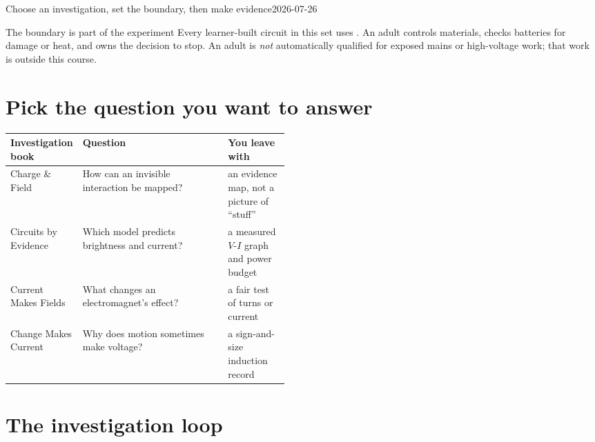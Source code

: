 

  {Choose an investigation, set the boundary, then make evidence}{2026-07-26}

\telosmasthead[\editiontag]

\begin{teloshazard}{The boundary is part of the experiment}
Every learner-built circuit in this set uses \lowvoltage. \stopline
An adult controls materials, checks batteries for damage or heat, and owns the
decision to stop. An adult is \emph{not} automatically qualified for exposed
mains or high-voltage work; that work is outside this course.
\end{teloshazard}

\section{Pick the question you want to answer}
\begin{tabularx}{\linewidth}{@{}p{0.25\linewidth}L p{0.22\linewidth}@{}}
\toprule
\textbf{Investigation book} & \textbf{Question} & \textbf{You leave with}\\
\midrule
Charge \& Field & How can an invisible interaction be mapped? &
an evidence map, not a picture of “stuff”\\
Circuits by Evidence & Which model predicts brightness and current? &
a measured \(V\)-\(I\) graph and power budget\\
Current Makes Fields & What changes an electromagnet's effect? &
a fair test of turns or current\\
Change Makes Current & Why does motion sometimes make voltage? &
a sign-and-size induction record\\
\bottomrule
\end{tabularx}

\section{The investigation loop}
\begin{center}
\end{center}

